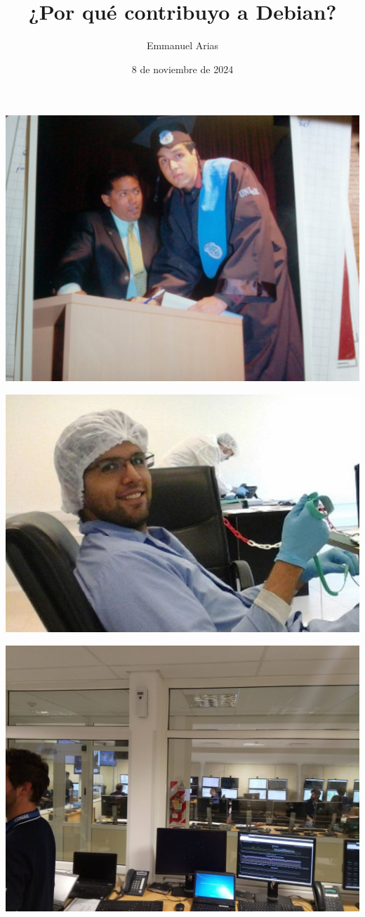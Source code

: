 \documentclass{beamer}
\title{¿Por qué contribuyo a Debian?}
\author{Emmanuel Arias}
\date{8 de noviembre de 2024}
\begin{document}
\begin{frame}[plain]
    \maketitle
\end{frame}


\begin{frame}
  \includegraphics[width=0.7\linewidth]{images/1.jpg}
\end{frame}

\begin{frame}
		\includegraphics[width=0.7\linewidth]{images/1.2}
\end{frame}

\begin{frame}
		\includegraphics[width=0.7\linewidth]{images/2}
\end{frame}
\end{document}
